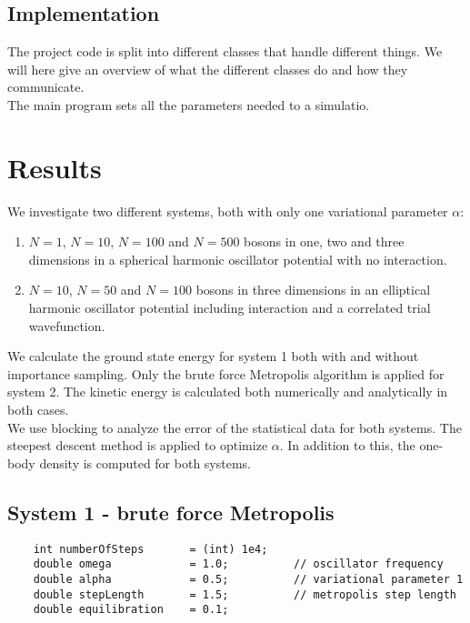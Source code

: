 \documentclass[english, a4paper]{article}
\begin{document}
\subsection{Implementation}

The project code is split into different classes that handle different things. We will here give an overview
of what the different classes do and how they communicate. \\

\noindent The main program sets all the parameters needed to a simulatio. 


\section{Results}

We investigate two different systems, both with only one variational parameter $\alpha$:
\begin{enumerate}
 \item $N=1$, $N=10$, $N=100$ and $N=500$ bosons in one, two and three dimensions in a
       spherical harmonic oscillator potential with no interaction.       
 \item $N=10$, $N=50$ and $N=100$ bosons in three dimensions
       in an elliptical harmonic oscillator potential including interaction and a
       correlated trial wavefunction. 
\end{enumerate}

We calculate the ground state energy for system 1 both with and without importance sampling.
Only the brute force Metropolis algorithm is applied for system 2.
The kinetic energy is calculated both numerically and analytically in both cases.\\

\noindent We use blocking to analyze the error of the statistical data for both systems.
The steepest descent method is applied to optimize $\alpha$. 
In addition to this, the one-body density is computed for both systems.


\subsection{System 1 - brute force Metropolis}

\begin{lstlisting}
    int numberOfSteps       = (int) 1e4;
    double omega            = 1.0;          // oscillator frequency
    double alpha            = 0.5;          // variational parameter 1
    double stepLength       = 1.5;          // metropolis step length
    double equilibration    = 0.1;          
\end{lstlisting}
\end{document}

